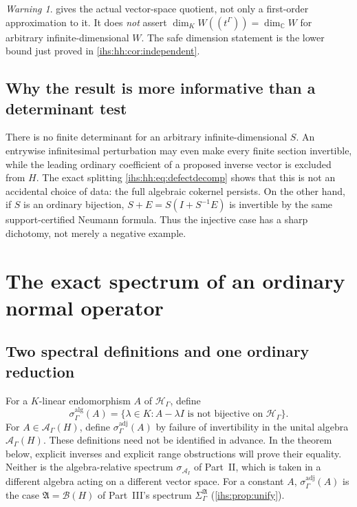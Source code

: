 \documentclass[11pt,a4paper]{article}
\numberwithin{equation}{section}
\theoremstyle{definition}
\theoremstyle{remark}
\newtheorem{warning}[warning]{Warning}
\newcommand{\C}{\mathbb C}
\newcommand{\K}{K}
\newcommand{\Hil}{\mathcal H_\Gamma}
\newcommand{\B}{\mathcal B(H)}
\newcommand{\Ahh}{\mathcal A_\Gamma(H)}
\newcommand{\Arf}{\mathcal A_I}
\newcommand{\Alg}{\mathfrak A}
\newcommand{\SigA}{\Sigma^{\Alg}_\Gamma}
\begin{document}
\begin{warning}\label{ihs:hh:warn:dimension}
 gives the actual vector-space quotient, not only a
first-order approximation to it. It does \emph{not} assert
$\dim_\K W((t^\Gamma))=\dim_\C W$ for arbitrary infinite-dimensional $W$.
The safe dimension statement is the lower bound just proved in
\cref{ihs:hh:cor:independent}.
\end{warning}

\subsection{Why the result is more informative than a determinant test}\label{ihs:hh:sec:nodet}
There is no finite determinant for an arbitrary infinite-dimensional $S$. An
entrywise infinitesimal perturbation may even make every finite section
invertible, while the leading ordinary coefficient of a proposed inverse
vector is excluded from $H$. The exact splitting
\eqref{ihs:hh:eq:defectdecomp} shows that this is not an accidental choice
of data: the full algebraic cokernel persists. On the other hand, if $S$ is
an ordinary bijection, $S+E=S(I+S^{-1}E)$ is invertible by the same
support-certified Neumann formula. Thus the injective case has a sharp
dichotomy, not merely a negative example.

\section{The exact spectrum of an ordinary normal operator}\label{ihs:hh:sec:spectrum}

\subsection{Two spectral definitions and one ordinary reduction}\label{ihs:hh:sec:twodefs}
For a $\K$-linear endomorphism $A$ of $\Hil$, define
\[
 \sigma_\Gamma^{\mathrm{alg}}(A)
 =\{\lambda\in\K:A-\lambda I\text{ is not bijective on }\Hil\}.
\]
For $A\in\Ahh$, define $\sigma_\Gamma^{\mathrm{adj}}(A)$ by failure of
invertibility in the unital algebra $\Ahh$. These definitions need not be
identified in advance. In the theorem below, explicit inverses and explicit
range obstructions will prove their equality. Neither is the
algebra-relative spectrum $\sigma_{\Arf}$ of Part~II, which is
taken in a different algebra acting on a different vector space. For a
constant $A$, $\sigma^{\mathrm{adj}}_\Gamma(A)$ is the case $\Alg=\B$ of
Part~III's spectrum $\SigA$ (\cref{ihs:prop:unify}).
\end{document}
